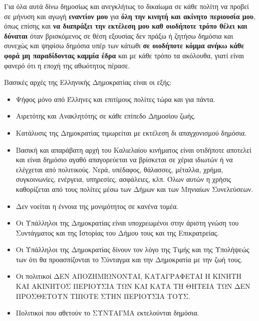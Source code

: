 \documentclass[a4paper]{article}
\begin{document}
Για όλα αυτά δίνω δημοσίως και ανεγκλήτως το δικαίωμα σε κάθε πολίτη να προβεί σε μήνυση και αγωγή \textbf{εναντίον μου} για \textbf{όλη την κινητή και ακίνητο περιουσία μου}, όπως επίσης και \textbf{να διαπράξει την εκτέλεση μου καθ οιοδήποτε τρόπο θέλει και δύναται} όταν βρισκόμενος σε θέση εξουσίας δεν πράξω ή ζητήσω δημόσια και συνεχώς και ψηφίσω δημόσια υπέρ των κάτωθι \textbf{σε οιοδήποτε κόμμα ανήκω κάθε φορά μη παραδίδοντας καμμία έδρα} και με κάθε τρόπο τα ακόλουθα, γιατί είναι φανερό ότι η εποχή της αθωότητος πέρασε.\par

Βασικές αρχές της Ελληνικής Δημοκρατίας είναι οι εξής:
\begin{itemize}
\bf
\item Ψήφος μόνο από Έλληνες και επιτίμους πολίτες τώρα και για πάντα.
\item Αιρετότης και Ανακλητότης σε κάθε επίπεδο Δημοσίου ζωής.
\item Κατάλυσις της Δημοκρατίας τιμωρείται με εκτέλεση δι απαγχονισμού δημόσια.
\item Βασική και απαράβατη αρχή του Καλιελαίου κινήματος είναι οτιδήποτε αποτελεί και είναι δημόσιο αγαθό απαγορεύεται να βρίσκεται σε χέρια ιδιωτών ή να ελέγχεται από πολιτικούς. Νερά, υπέδαφος, θάλασσες, μέταλλα, χρήμα, συγκοινωνίες, ενέργεια, υπηρεσίες, ασφάλειες, κλπ. Όλων αυτών η χρήσις καθορίζεται από τους πολίτες μέσω των Δήμων και των Μηνιαίων Συνελεύσεων.
\item Δεν νοείται η έννοια της μονιμότητος σε κανένα τομέα.
\item Οι Υπάλληλοι της Δημοκρατίας είναι υποχρεωμένοι στην άριστη γνώση του Συντάγματος και της Ιστορίας του Δήμου τους και της Επικρατρείας.
\item Οι Υπάλληλοι της Δημοκρατίας δίνουν τον λόγο της Τιμής και της Υπολήψεώς των ότι θα προασπίζονται το Σύνταγμα και την Δημοκρατία με την ζωή τους.
\item Οι πολιτικοί ΔΕΝ ΑΠΟΖΗΜΙΩΝΟΝΤΑΙ, ΚΑΤΑΓΡΑΦΕΤΑΙ Η ΚΙΝΗΤΗ ΚΑΙ ΑΚΙΝΗΤΟΣ ΠΕΡΙΟΥΣΙΑ ΤΩΝ ΚΑΙ ΚΑΤΑ ΤΗ ΘΗΤΕΙΑ ΤΩΝ ΔΕΝ ΠΡΟΣΘΕΤΟΥΝ ΤΙΠΟΤΕ ΣΤΗΝ ΠΕΡΙΟΥΣΙΑ ΤΟΥΣ.
\item Πολιτικοί που αθετούν το ΣΥΝΤΑΓΜΑ εκτελούνται δημόσια.

\end{itemize}
\end{document}

